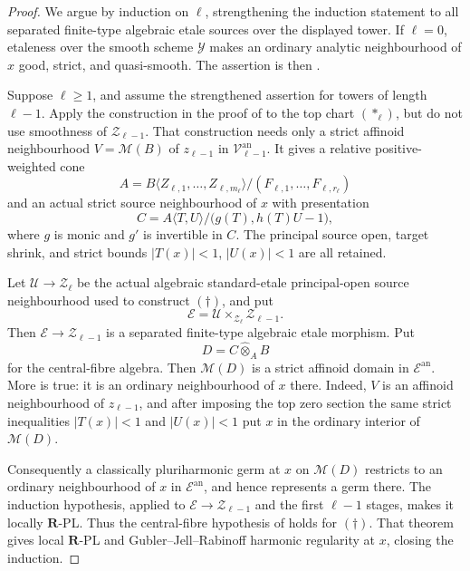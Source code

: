 \begin{proof}
We argue by induction on \(\ell\), strengthening the induction statement to
all separated finite-type algebraic etale sources over the displayed tower.
If \(\ell=0\), etaleness over the smooth scheme \(\mathcal Y\) makes an
ordinary analytic neighbourhood of \(x\) good, strict, and quasi-smooth.
The assertion is then .

Suppose \(\ell\geq1\), and assume the strengthened assertion for towers of
length \(\ell-1\).  Apply the construction in the proof of
 to the top chart
\((*_\ell)\), but do not use smoothness of \(\mathcal Z_{\ell-1}\).  That
construction needs only a strict affinoid neighbourhood
\(V=\mathcal M(B)\) of \(z_{\ell-1}\) in
\(\mathcal V_{\ell-1}^{\mathrm{an}}\).  It gives a relative
positive-weighted cone
\[
 A=B\langle Z_{\ell,1},\ldots,Z_{\ell,m_\ell}\rangle/
       (F_{\ell,1},\ldots,F_{\ell,r_\ell})
\]
and an actual strict source neighbourhood of \(x\) with presentation
\[
 C=A\langle T,U\rangle/\bigl(g(T),h(T)U-1\bigr),                  \tag{\(\dagger\)}
\]
where \(g\) is monic and \(g'\) is invertible in \(C\).  The principal
source open, target shrink, and strict bounds \(|T(x)|<1\), \(|U(x)|<1\)
are all retained.

Let \(\mathcal U\to\mathcal Z_\ell\) be the actual algebraic
standard-etale principal-open source neighbourhood used to construct
\((\dagger)\), and put
\[
 \mathcal E=\mathcal U\times_{\mathcal Z_\ell}
                         \mathcal Z_{\ell-1}.
\]
Then \(\mathcal E\to\mathcal Z_{\ell-1}\) is a separated finite-type
algebraic etale morphism.  Put
\[
                           D=C\widehat\otimes_A B
\]
for the central-fibre algebra.  Then \(\mathcal M(D)\) is a strict affinoid
domain in \(\mathcal E^{\mathrm{an}}\).  More is true: it is an ordinary
neighbourhood of \(x\) there.  Indeed, \(V\) is an
affinoid neighbourhood of \(z_{\ell-1}\), and after imposing the top zero
section the same strict inequalities \(|T(x)|<1\) and \(|U(x)|<1\) put
\(x\) in the ordinary interior of \(\mathcal M(D)\).

Consequently a classically pluriharmonic germ at \(x\) on
\(\mathcal M(D)\) restricts to an ordinary neighbourhood of \(x\) in
\(\mathcal E^{\mathrm{an}}\), and hence represents a germ there.  The
induction hypothesis, applied to
\(\mathcal E\to\mathcal Z_{\ell-1}\) and the first \(\ell-1\) stages,
makes it locally \(\mathbf R\)-PL.  Thus the central-fibre hypothesis of
 holds for
\((\dagger)\).  That theorem gives local \(\mathbf R\)-PL and
Gubler--Jell--Rabinoff harmonic regularity at \(x\), closing the induction.
\end{proof}
